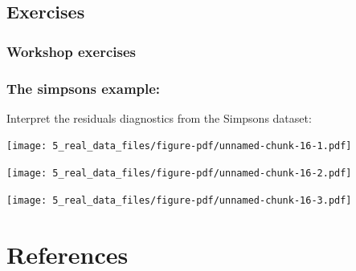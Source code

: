 \documentclass[
  letterpaper,
  DIV=11,
  numbers=noendperiod]{scrreprt}
\begin{document}
\section{Exercises}\label{exercises-4}

\subsection{Workshop exercises}\label{workshop-exercises}

\subsection{The simpsons example:}\label{the-simpsons-example}

Interpret the residuals diagnostics from the Simpsons dataset:

\texttt{[image: 5\_real\_data\_files/figure-pdf/unnamed-chunk-16-1.pdf]}

\texttt{[image: 5\_real\_data\_files/figure-pdf/unnamed-chunk-16-2.pdf]}

\texttt{[image: 5\_real\_data\_files/figure-pdf/unnamed-chunk-16-3.pdf]}


\chapter*{References}\label{references}

\end{document}
